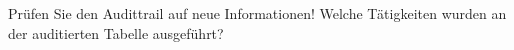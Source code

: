    \item Pr\"ufen Sie den Audittrail auf neue Informationen! Welche T\"atigkeiten wurden an der auditierten Tabelle ausgef\"uhrt?
